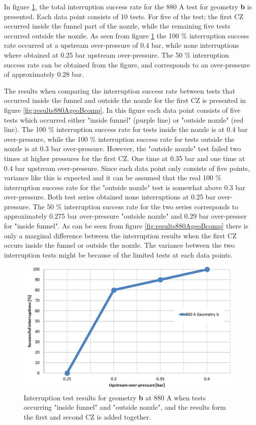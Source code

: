 \documentclass[10pt,b5paper,twoside]{article}
\begin{document}
In figure \ref{fig:results880AgeoB}, the total interruption success rate for the 880 A test for geometry \textbf{b} is presented. Each data point consists of 10 tests. For five of the test; the first CZ occurred inside the funnel part of the nozzle, while the remaining five tests occurred outside the nozzle. As seen from figure \ref{fig:results880AgeoB} the 100 \% interruption success rate occurred at a upstream over-pressure of 0.4 bar, while none interruptions where obtained at 0.25 bar upstream over-pressure. The 50 \% interruption success rate can be obtained from the figure, and corresponds to an over-pressure of approximately 0.28 bar.

The results when comparing the interruption success rate between tests that occurred inside the funnel and outside the nozzle for the first CZ is presented in figure \ref{fig:results880AgeoBcomp}. In this figure each data point consists of five tests which occurred either "inside funnel" (purple line) or "outside nozzle" (red line). The 100 \% interruption success rate for tests inside the nozzle is at 0.4 bar over-pressure, while the 100 \% interruption success rate for tests outside the nozzle is at 0.3 bar over-pressure. However, the "outside nozzle" test failed two times at higher pressures for the first CZ. One time at 0.35 bar and one time at 0.4 bar upstream over-pressure. Since each data point only consists of five points, variance like this is expected and it can be assumed that the real 100 \% interruption success rate for the "outside nozzle" test is somewhat above 0.3 bar over-pressure. Both test series obtained none interruptions at 0.25 bar over-pressure. The 50 \% interruption success rate for the two series corresponds to approximately 0.275 bar over-pressure "outside nozzle" and 0.29 bar over-presser for "inside funnel". As can be seen from figure \ref{fig:results880AgeoBcomp} there is only a marginal difference between the interruption results when the first CZ occurs inside the funnel or outside the nozzle. The variance between the two interruption tests might be because of the limited tests at each data points.

\begin{figure}[H]
\centering
\includegraphics[scale=0.45]{Bilder/Results/geoB880amp.png}
\caption{Interruption test results for geometry \textbf{b} at 880 A when tests occurring "inside funnel" and "outside nozzle", and the results form the first and second CZ is added together.} \label{fig:results880AgeoB}
\end{figure}
\end{document}
